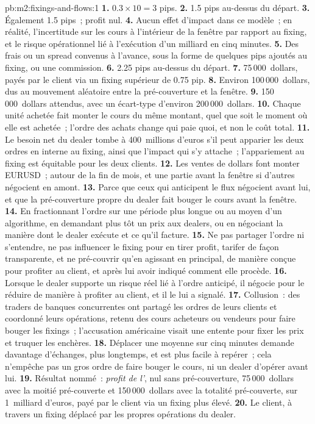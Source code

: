 \begin{solution}{pb:m2:fixings-and-flows:1}
\textbf{1.} $0.3 \times 10 = 3$ pips.
\textbf{2.} 1.5 pips au-dessus du départ.
\textbf{3.} Également 1.5 pips~; profit nul.
\textbf{4.} Aucun effet d'impact dans ce modèle~; en réalité, l'incertitude sur les cours
à l'intérieur de la fenêtre par rapport au fixing, et le risque opérationnel lié à l'exécution
d'un milliard en cinq minutes.
\textbf{5.} Des frais ou un spread convenus à l'avance, sous la forme de quelques pips ajoutés au fixing,
ou une commission.
\textbf{6.} 2.25 pips au-dessus du départ.
\textbf{7.} 75\,000~dollars, payés par le client via un fixing supérieur de 0.75 pip.
\textbf{8.} Environ 100\,000~dollars, dus au mouvement aléatoire entre la pré-couverture et
la fenêtre.
\textbf{9.} 150\,000~dollars attendus, avec un écart-type d'environ 200\,000~dollars.
\textbf{10.} Chaque unité achetée fait monter le cours du même montant, quel que soit le moment où elle est
achetée~; l'ordre des achats change qui paie quoi, et non le coût total.
\textbf{11.} Le besoin net du dealer tombe à 400~millions d'euros s'il peut apparier les
deux ordres en interne au fixing, ainsi que l'impact qui s'y attache~; l'appariement au fixing est
équitable pour les deux clients.
\textbf{12.} Les ventes de dollars font monter EURUSD~; autour de la fin de mois, et une partie avant
la fenêtre si d'autres négocient en amont.
\textbf{13.} Parce que ceux qui anticipent le flux négocient avant lui, et que la
pré-couverture propre du dealer fait bouger le cours avant la fenêtre.
\textbf{14.} En fractionnant l'ordre sur une période plus longue ou au moyen d'un algorithme, en
demandant plus tôt un prix aux dealers, ou en négociant la manière dont le dealer exécute et
ce qu'il facture.
\textbf{15.} Ne pas partager l'ordre ni s'entendre, ne pas influencer le fixing pour en tirer profit,
tarifer de façon transparente, et ne pré-couvrir qu'en agissant en principal, de
manière conçue pour profiter au client, et après lui avoir indiqué comment elle procède.
\textbf{16.} Lorsque le dealer supporte un risque réel lié à l'ordre anticipé, il négocie
pour le réduire de manière à profiter au client, et il le lui a signalé.
\textbf{17.} Collusion~: des traders de banques concurrentes ont partagé les ordres de leurs clients et
coordonné leurs opérations, retenu des cours acheteurs ou vendeurs pour faire bouger les fixings~;
l'accusation américaine visait une entente pour fixer les prix et truquer les enchères.
\textbf{18.} Déplacer une moyenne sur cinq minutes demande davantage d'échanges, plus longtemps, et est
plus facile à repérer~; cela n'empêche pas un gros ordre de faire bouger le cours, ni
un dealer d'opérer avant lui.
\textbf{19.} Résultat nommé~: \emph{profit de l'}, nul sans
pré-couverture, 75\,000~dollars avec la moitié pré-couverte et 150\,000~dollars avec la totalité
pré-couverte, sur 1~milliard d'euros, payé par le client via un fixing plus élevé.
\textbf{20.} Le client, à travers un fixing déplacé par les propres opérations du dealer.
\end{solution}

